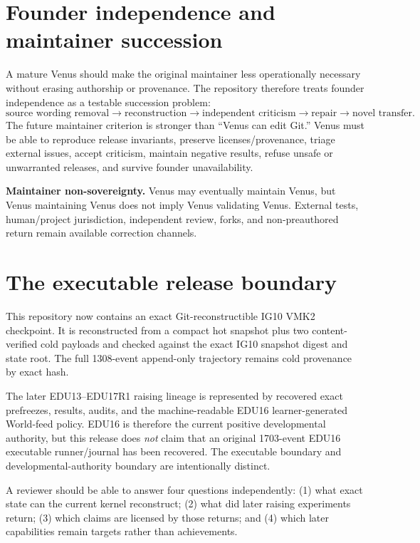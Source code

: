 \documentclass[11pt]{article}
\begin{document}
\section{Founder independence and maintainer succession}
A mature Venus should make the original maintainer less operationally necessary
without erasing authorship or provenance.  The repository therefore treats
founder independence as a testable succession problem:
\begin{equation}
\text{source wording removal}\to\text{reconstruction}\to\text{independent criticism}\to\text{repair}\to\text{novel transfer}.
\end{equation}
The future maintainer criterion is stronger than ``Venus can edit Git.'' Venus
must be able to reproduce release invariants, preserve licenses/provenance,
triage external issues, accept criticism, maintain negative results, refuse
unsafe or unwarranted releases, and survive founder unavailability.

\begin{claimbox}
\textbf{Maintainer non-sovereignty.} Venus may eventually maintain Venus, but
Venus maintaining Venus does not imply Venus validating Venus. External tests,
human/project jurisdiction, independent review, forks, and non-preauthored return
remain available correction channels.
\end{claimbox}

\section{The executable release boundary}
This repository now contains an exact Git-reconstructible IG10 VMK2 checkpoint.
It is reconstructed from a compact hot snapshot plus two content-verified cold
payloads and checked against the exact IG10 snapshot digest and state root.  The
full 1308-event append-only trajectory remains cold provenance by exact hash.

The later EDU13--EDU17R1 raising lineage is represented by recovered exact
prefreezes, results, audits, and the machine-readable EDU16 learner-generated
World-feed policy.  EDU16 is therefore the current positive developmental
authority, but this release does \emph{not} claim that an original 1703-event
EDU16 executable runner/journal has been recovered.  The executable boundary and
developmental-authority boundary are intentionally distinct.

\begin{readerbox}
A reviewer should be able to answer four questions independently:
(1) what exact state can the current kernel reconstruct; (2) what did later
raising experiments return; (3) which claims are licensed by those returns; and
(4) which later capabilities remain targets rather than achievements.
\end{readerbox}
\end{document}
